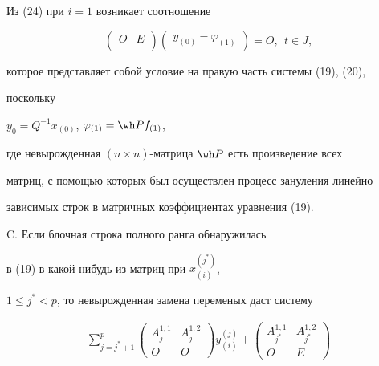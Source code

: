 \begin{pf}
Из (24) при $i=1$ возникает соотношение


\begin{equation}


\begin{pmatrix}


 O & E \\


\end{pmatrix} \begin{pmatrix} y_{(0)}-\varphi_{(1)} \end{pmatrix}=O,


\ \ t \in J, 


\end{equation}


которое представляет собой условие на правую часть системы (19), (20),


поскольку


$y_0=Q^{-1}x_{(0)}$, $\varphi_{(1)}=\wh P f_{(1)}$,


где невырожденная $(n \times n)$-матрица $\wh P$ есть произведение всех


матриц, с помощью которых был осуществлен процесс зануления линейно 


зависимых строк в матричных коэффициентах уравнения (19).


\smallskip





C. Если блочная строка полного ранга обнаружилась


в (19) в какой-нибудь из матриц при $x_{(i)}^{(j^*)}$,


$1 \le j^* < p$, то невырожденная замена переменых даст систему 


\begin{multline*}


\sum_{j=j^*+1}^{p}{


{\begin{pmatrix}


 A_j^{1,1} & A_j^{1,2} \\ O & O


\end{pmatrix}}


y_{(i)}^{(j)}}+


{\begin{pmatrix}


 A_{j^*}^{1,1} & A_{j^*}^{1,2} \\  O & E


\end{pmatrix}}



\end{multline*}
\end{pf}

